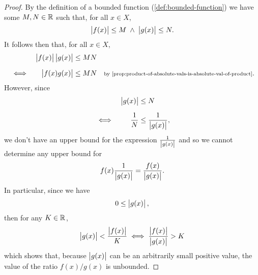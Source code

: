 \documentclass[../MathsNotesBase.tex]{subfiles}
\begin{document}
{		\bigskip
		\begin{proof}\nl[4]
			By the definition of a bounded function (\ref{def:bounded-function}) we have some ${ M,N \in \mathbb{R}^{} }$ such that, for all ${ x \in X }$,
			\[ \left\lvert f(x)\right\rvert \leq M \; \land \; \left\lvert g(x)\right\rvert \leq N. \]
			It follows then that, for all ${ x \in X }$,
			\[\begin{aligned}
				&& \abs{f(x)}\abs{g(x)} &\leq MN  \nn
				&\iff & \abs{f(x)g(x)} &\leq MN &\sidecomment{by \autoref{prop:product-of-absolute-vals-is-absolute-val-of-product}}.
			\end{aligned}\]
			However, since
			\[\begin{aligned}
				&& \abs{g(x)} &\leq N \nn
				&\iff & \frac{1}{N} &\leq \frac{1}{\abs{g(x)}},
			\end{aligned}\]
			we don't have an upper bound for the expression ${ \frac{1}{\left\lvert g(x)\right\rvert} }$ and so we cannot determine any upper bound for
			\[ f(x) \frac{1}{\left\lvert g(x)\right\rvert} = \frac{f(x)}{\left\lvert g(x)\right\rvert}. \]
			In particular, since we have
			\[ 0 \leq \left\lvert g(x)\right\rvert, \]
			then for any ${ K \in \mathbb{R}^{} }$,
			\[ \left\lvert g(x)\right\rvert < \frac{\left\lvert f(x)\right\rvert}{K} \iff \frac{\left\lvert f(x)\right\rvert}{\left\lvert g(x)\right\rvert} > K \]
			which shows that, because $\left\lvert g(x)\right\rvert$ can be an arbitrarily small positive value, the value of the ratio $f(x)/g(x)$ is unbounded.
		\end{proof}
		
		\nl[8]

		\label{def:function-tends-to-a-value}
	
}
\end{document}
